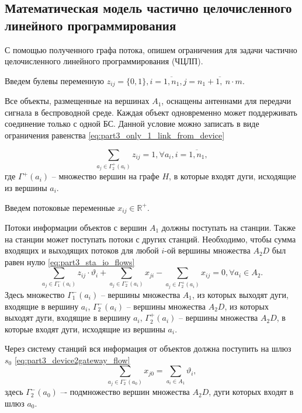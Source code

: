 \subsection{Математическая модель частично целочисленного линейного программирования}

С помощью полученного графа потока, опишем ограничения для задачи частично целочисленного линейного программирования (ЧЦЛП).

Введем булевы переменную $z_{ij} = \{0, 1\}, i = \overline{1,n_1}, j = \overline{n_1+1, \ n \cdot m}$.


Все объекты, размещенные на вершинах $A_1$, оснащены антеннами для передачи сигнала в беспроводной среде. Каждая объект одновременно может поддерживать соединение только с одной БС. Данной условие можно записать в виде ограничения равенства \cref{eq:part3_only_1_link_from_device}


\begin{equation}\label{eq:part3_only_1_link_from_device}
    \sum_{a_j \in \Gamma_2^+(a_i)} z_{ij} = 1, \forall a_i, i =\overline{1, n_1},
\end{equation} 
где $\Gamma^+(a_i)$ -- множество вершин на графе $H$, в которые входят дуги, исходящие из вершины $a_i$.

Введем потоковые переменные $x_{ij} \in \mathbb{R}^+$.

Потоки информации объектов с вершин $A_1$ должны поступать на станции. Также на станции может поступать потоки с других станций. Необходимо, чтобы сумма входящих и выходящих потоков для любой $i$-ой вершины множества $A_2D$ был равен нулю \cref{eq:part3_sta_io_flows}
\begin{equation}\label{eq:part3_sta_io_flows}
    \sum_{a_j \in \Gamma_1^-(a_i)} z_{ij} \cdot \vartheta_i + \sum_{a_j \in \Gamma_2^-(a_i)} x_{ji} -  \sum_{a_j \in \Gamma_2^+(a_i)} x_{ij} =0 ,\forall a_i \in A_2. 
\end{equation} 
Здесь множество $\Gamma_1^-(a_i)$ -- вершины множества $A_1$, из которых выходят дуги, входящие в вершину $a_i$, $\Gamma_2^-(a_i)$ -- вершины множества $A_2D$, из которых выходят дуги, входящие в  вершину $a_i$, $\Gamma_2^+(a_i)$ -- вершины множества $A_2D$, в которые входят дуги, исходящие из вершины  $a_i$.

Через систему станций вся информация от объектов  должна поступить на шлюз $s_0$ \cref{eq:part3_device2gateway_flow} 
\begin{equation}\label{eq:part3_device2gateway_flow}
    \sum_{a_j \in \Gamma_2^-(a_0)} x_{j0} = \sum_{a_i \in A_1} \vartheta_i,
\end{equation}
здесь $\Gamma_2^-(a_0)$ –- подмножество вершин множества $A_2D$, дуги которых входят в шлюз $a_0$.

